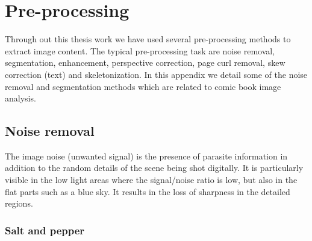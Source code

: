 \chapter{Pre-processing}
\label{app:pre-processing}
\graphicspath{{./chapters/Appendix/figs/}}


Through out this thesis work we have used several pre-processing methods to extract image content.
The typical pre-processing task are noise removal, segmentation, enhancement, perspective correction, page curl removal, skew correction (text) and skeletonization.
In this appendix we detail some of the noise removal and segmentation methods which are related to comic book image analysis.




\section*{Noise removal} %
\label{sub:ap:noise_removal}
The image noise (unwanted signal) is the presence of parasite information in addition to the random details of the scene being shot digitally.
It is particularly visible in the low light areas where the signal/noise ratio is low, but also in the flat parts such as a blue sky.
It results in the loss of sharpness in the detailed regions.

\subsection*{Salt and pepper} %
\label{sub:salt_and_paper}


